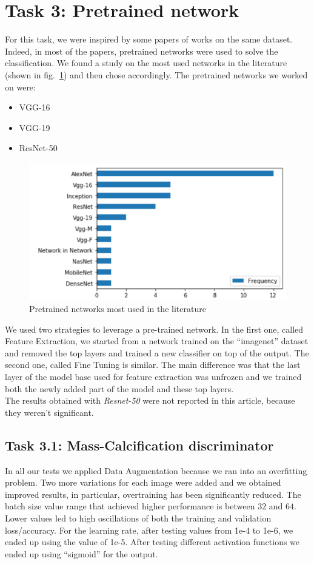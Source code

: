 \documentclass[11pt,a4paper,oneside]{article}
\begin{document}
\section{Task 3: Pretrained network}
For this task, we were inspired by some papers of works on the same dataset. Indeed, in most of the papers, pretrained networks were used to solve the classification. 
We found a study on the most used networks in the literature (shown in fig.~\ref{fig:pretrained_networks}) and then chose accordingly. The pretrained networks we worked on were:
\begin{itemize}
\item VGG-16
\item VGG-19
\item ResNet-50
\end{itemize}

\begin{figure}[h]
\centering
\includegraphics[width=.5\textwidth]{images/pretrained_networks}
\caption{Pretrained networks most used in the literature}
\label{fig:pretrained_networks}
\end{figure}

We used two strategies to leverage a pre-trained network. In the first one, called Feature Extraction, we started from a network trained on the “imagenet” dataset and removed the top layers and trained a new classifier on top of the output.
The second one, called Fine Tuning is similar. The main difference was that the last layer of the model base used for feature extraction was unfrozen and we trained both the newly added part of the model and these top layers. \\
The results obtained with \textit{Resnet-50} were not reported in this article, because they weren't significant.

\subsection{Task 3.1: Mass-Calcification discriminator}
In all our tests we applied Data Augmentation because we ran into an overfitting problem. Two more variations for each image were added and we obtained improved results, in particular, overtraining has been significantly reduced. The batch size value range that achieved higher performance is between $32$ and $64$. Lower values led to high oscillations of both the training and validation loss/accuracy. For the learning rate, after testing values from 1e-4 to 1e-6, we ended up using the value of 1e-5. After testing different activation functions we ended up using “sigmoid” for the output. \\
\end{document}
